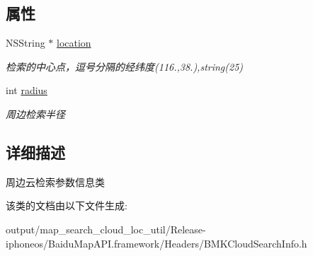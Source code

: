 \subsection*{属性}
\begin{DoxyCompactItemize}
\item 
\hypertarget{interface_b_m_k_cloud_nearby_search_info_ae129357a1f589b69f9a2f8ca3613f015}{}N\+S\+String $\ast$ \hyperlink{interface_b_m_k_cloud_nearby_search_info_ae129357a1f589b69f9a2f8ca3613f015}{location}\label{interface_b_m_k_cloud_nearby_search_info_ae129357a1f589b69f9a2f8ca3613f015}

\begin{DoxyCompactList}\small\item\em 检索的中心点，逗号分隔的经纬度(116.,38.),string(25) \end{DoxyCompactList}\item 
\hypertarget{interface_b_m_k_cloud_nearby_search_info_af736625a3a921ec13dd0c8a6deb1c52f}{}int \hyperlink{interface_b_m_k_cloud_nearby_search_info_af736625a3a921ec13dd0c8a6deb1c52f}{radius}\label{interface_b_m_k_cloud_nearby_search_info_af736625a3a921ec13dd0c8a6deb1c52f}

\begin{DoxyCompactList}\small\item\em 周边检索半径 \end{DoxyCompactList}\end{DoxyCompactItemize}


\subsection{详细描述}
周边云检索参数信息类 

该类的文档由以下文件生成\+:\begin{DoxyCompactItemize}
\item 
output/map\+\_\+search\+\_\+cloud\+\_\+loc\+\_\+util/\+Release-\/iphoneos/\+Baidu\+Map\+A\+P\+I.\+framework/\+Headers/B\+M\+K\+Cloud\+Search\+Info.\+h\end{DoxyCompactItemize}
